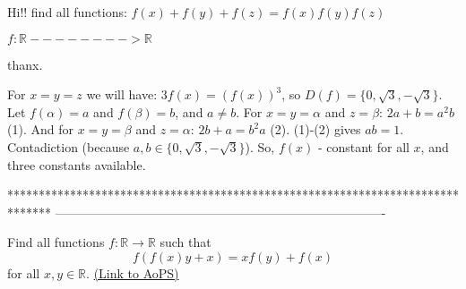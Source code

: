 \begin{solution}
	\begin{tcolorbox}Hi!!
find all functions:
$ f(x) + f(y) + f(z) = f(x)f(y)f(z)$

$ f: \mathbb{R} - - - - - - - - > \mathbb{R}$

thanx.\end{tcolorbox}
For $ x = y = z$ we will have: $ 3f(x) = (f(x))^3$, so $ D(f) = \{0,\sqrt{3}, - \sqrt{3}\}$.
Let $ f(\alpha ) = a$ and $ f(\beta ) = b$, and $ a\neq b$. For $ x = y = \alpha$ and $ z = \beta$:
$ 2a + b = a^2b$ (1).
And for $ x = y = \beta$ and $ z = \alpha$:
$ 2b + a = b^2a$ (2).
(1)-(2) gives $ ab = 1$. Contadiction (because $ a,b\in \{0,\sqrt{3}, - \sqrt{3}\}$).
So, $ f(x)$ - constant for all $ x$, and three constants available.
\end{solution}
*******************************************************************************
-------------------------------------------------------------------------------

\begin{problem}
	Find all functions $f: \mathbb R \to \mathbb R$ such that
\[f(f(x)y+x)=xf(y)+f(x)\]
for all $x,y \in \mathbb R$.
	\flushright \href{https://artofproblemsolving.com/community/c6h295583}{(Link to AoPS)}
\end{problem}



